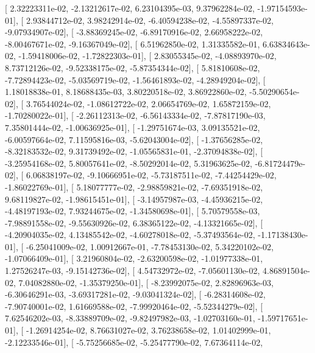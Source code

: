 \documentclass{article}
\begin{document}
       [  2.32223311e-02,  -2.13212617e-02,   6.23104395e-03,
          9.37962284e-02,  -1.97154593e-01],
       [  2.93844712e-02,   3.98242914e-02,  -6.40594238e-02,
         -4.55897337e-02,  -9.07934907e-02],
       [ -3.88369245e-02,  -6.89170916e-02,   2.66958222e-02,
         -8.00467671e-02,  -9.16367049e-02],
       [  6.51962850e-02,   1.31335582e-01,   6.63834643e-02,
         -1.59418006e-02,  -1.72822303e-01],
       [  2.83055345e-02,  -4.08893970e-02,   8.73712126e-02,
         -9.52338175e-02,  -5.87354344e-02],
       [  5.81810608e-02,  -7.72894423e-02,  -5.03569719e-02,
         -1.56461893e-02,  -4.28949204e-02],
       [  1.18018838e-01,   8.18688435e-03,   3.80220518e-02,
          3.86922860e-02,  -5.50290654e-02],
       [  3.76544024e-02,  -1.08612722e-02,   2.06654769e-02,
          1.65872159e-02,  -1.70280022e-01],
       [ -2.26112313e-02,  -6.56143334e-02,  -7.87817190e-03,
          7.35801444e-02,  -1.00636925e-01],
       [ -1.29751674e-03,   3.09135521e-02,  -6.00597664e-02,
          7.11595816e-03,  -5.62043004e-02],
       [ -1.37656285e-02,  -8.32183532e-02,   9.31739492e-02,
         -1.05565831e-01,  -2.37094838e-02],
       [ -3.25954168e-02,   5.80057641e-02,  -8.50292014e-02,
          5.31963625e-02,  -6.81724479e-02],
       [  6.06838197e-02,  -9.10666951e-02,  -5.73187511e-02,
         -7.44254429e-02,  -1.86022769e-01],
       [  5.18077777e-02,  -2.98859821e-02,  -7.69351918e-02,
          9.68119827e-02,  -1.98615451e-01],
       [ -3.14957987e-03,  -4.45936215e-02,  -4.48197193e-02,
          7.93244675e-02,  -1.34580698e-01],
       [  5.70579558e-03,  -7.98891558e-02,  -9.55630926e-02,
          6.38365122e-02,  -4.13321665e-02],
       [ -4.20904035e-02,   4.13485542e-02,  -4.60278018e-02,
         -5.37493564e-02,  -1.17138430e-01],
       [ -6.25041009e-02,   1.00912667e-01,  -7.78453130e-02,
          5.34220102e-02,  -1.07066409e-01],
       [  3.21960804e-02,  -2.63200598e-02,  -1.01977338e-01,
          1.27526247e-03,  -9.15142736e-02],
       [  4.54732972e-02,  -7.05601130e-02,   4.86891504e-02,
          7.04082880e-02,  -1.35379250e-01],
       [ -8.23992075e-02,   2.82896963e-03,  -6.30646291e-03,
         -3.69317281e-02,  -9.03041324e-02],
       [ -6.28314608e-02,  -7.90740001e-02,   1.61669588e-02,
         -7.99920464e-02,  -5.52344279e-02],
       [  7.62546202e-03,  -8.33889709e-02,  -9.82497982e-03,
         -1.02703160e-01,  -1.59717651e-01],
       [ -1.26914254e-02,   8.76631027e-02,   3.76238658e-02,
          1.01402999e-01,  -2.12233546e-01],
       [ -5.75256685e-02,  -5.25477790e-02,   7.67364114e-02,
\end{document}
